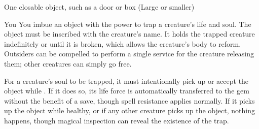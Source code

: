 \begin{spelltarget}{One closable object, such as a door or box (Large or smaller)}
\begin{spelltarget}{You}
\spelleffect You imbue an object with the power to trap a creature's life and soul. The object must be inscribed with the creature's name. It holds the trapped creature indefinitely or until it is broken, which allows the creature's body to reform. Outsiders can be compelled to perform a single service for the creature releasing them; other creatures can simply go free.
\par For a creature's soul to be trapped, it must intentionally pick up or accept the object while \bloodied. If it does so, its life force is automatically transferred to the gem without the benefit of a save, though spell resistance applies normally. If it picks up the object while healthy, or if any other creature picks up the object, nothing happens, though magical inspection can reveal the existence of the trap.


\end{spelltarget}
\end{spelltarget}
